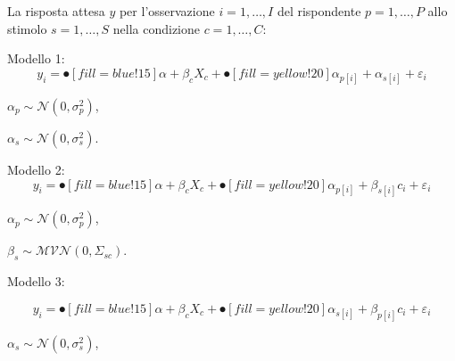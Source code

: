 \documentclass[compress]{beamer}
\begin{document}
\begin{frame}
	\begin{footnotesize}
		La risposta attesa $y$ per l'osservazione $i = 1, \ldots, I$ del rispondente $p = 1,\ldots, P$ allo stimolo $s = 1,\ldots, S$ nella condizione $c= 1,\ldots, C$:
	\end{footnotesize}
	\footnotesize
	
	\vspace{3mm}
	Modello 1:
	\begin{equation*}\label{AccuracyMin}
		y_{i} = \spot[fill =blue!15]{\alpha + \beta_c X_c}  + \spot[fill=yellow!20]{\alpha_{p[i]} +  \alpha_{s[i]} + \varepsilon_{i}}
	\end{equation*}
	\begin{centering}
		
		$\alpha_p \sim \mathcal{N}(0, \sigma_p^2)$,
		
	\end{centering}
	
	\begin{centering}
		
		$\alpha_s \sim \mathcal{N}(0, \sigma_s^2)$.
		
	\end{centering}
	
	
	
	Modello 2: 
	\begin{equation*}\label{Accuracy5}
		y_{i} = \spot[fill =blue!15]{\alpha + \beta_c X_c}  + \spot[fill=yellow!20]{ \alpha_{p[i]} +  \beta_{s[i]}c_{i} + \varepsilon_{i}}
	\end{equation*}
	
	\begin{centering}
		$\alpha_p \sim \mathcal{N}(0, \sigma_p^2)$,
		
	\end{centering}
	
	\begin{centering}
		
		$\beta_s \sim \mathcal{MVN}(0, \Sigma_{sc})$.
		
	\end{centering}
	
	Modello 3: 
	
	\begin{equation*}
		y_{i} = \spot[fill =blue!15]{\alpha + \beta_c X_c}  + \spot[fill=yellow!20]{\alpha_{s[i]} +  \beta_{p[i]}c_{i} + \varepsilon_{i}}
	\end{equation*}
	
	\begin{centering}
		$\alpha_s \sim \mathcal{N}(0, \sigma_s^2)$,
		

\end{centering}
\end{frame}
\end{document}
